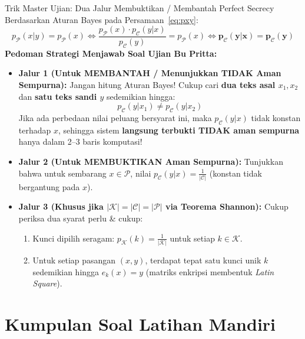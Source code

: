 \documentclass[11pt,a4paper]{article}
\begin{document}
\begin{tipsbox}{Trik Master Ujian: Dua Jalur Membuktikan / Membantah Perfect Secrecy}
Berdasarkan Aturan Bayes pada Persamaan~\eqref{eq:pxy}:
\[
p_{\mathcal{P}}(x|y) = p_{\mathcal{P}}(x) \iff \frac{p_{\mathcal{P}}(x) \cdot p_{\mathcal{C}}(y|x)}{p_{\mathcal{C}}(y)} = p_{\mathcal{P}}(x) \iff \mathbf{p_{\mathcal{C}}(y|x) = p_{\mathcal{C}}(y)}
\]
\textbf{Pedoman Strategi Menjawab Soal Ujian Bu Pritta:}
\begin{itemize}[leftmargin=*]
    \item \textbf{Jalur 1 (Untuk MEMBANTAH / Menunjukkan TIDAK Aman Sempurna):}
    Jangan hitung Aturan Bayes! Cukup cari \textbf{dua teks asal $x_1, x_2$} dan \textbf{satu teks sandi $y$} sedemikian hingga:
    \[
    p_{\mathcal{C}}(y|x_1) \ne p_{\mathcal{C}}(y|x_2)
    \]
    Jika ada perbedaan nilai peluang bersyarat ini, maka $p_{\mathcal{C}}(y|x)$ tidak konstan terhadap $x$, sehingga sistem \textbf{langsung terbukti TIDAK aman sempurna} hanya dalam 2--3 baris komputasi!
    \item \textbf{Jalur 2 (Untuk MEMBUKTIKAN Aman Sempurna):}
    Tunjukkan bahwa untuk sembarang $x \in \mathcal{P}$, nilai $p_{\mathcal{C}}(y|x) = \frac{1}{|\mathcal{C}|}$ (konstan tidak bergantung pada $x$).
    \item \textbf{Jalur 3 (Khusus jika $|\mathcal{K}| = |\mathcal{C}| = |\mathcal{P}|$ via Teorema Shannon):}
    Cukup periksa dua syarat perlu \& cukup:
    \begin{enumerate}
        \item Kunci dipilih seragam: $p_{\mathcal{K}}(k) = \frac{1}{|\mathcal{K}|}$ untuk setiap $k \in \mathcal{K}$.
        \item Untuk setiap pasangan $(x, y)$, terdapat tepat satu kunci unik $k$ sedemikian hingga $e_k(x) = y$ (matriks enkripsi membentuk \textit{Latin Square}).
    \end{enumerate}
\end{itemize}
\end{tipsbox}

\newpage

\section{Kumpulan Soal Latihan Mandiri}
\end{document}
